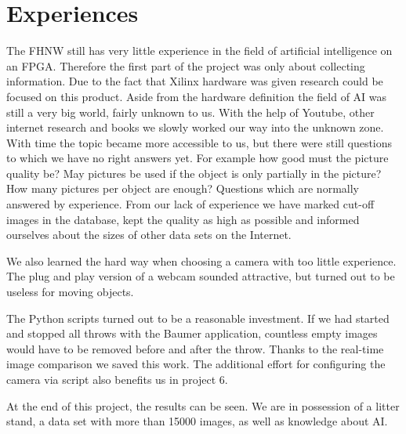 \section{Experiences}
\label{sec:experiences}

The FHNW still has very little experience in the field of artificial intelligence on an FPGA.
Therefore the first part of the project was only about collecting information.
Due to the fact that Xilinx hardware was given research could be focused on this product.
Aside from the hardware definition the field of AI was still a very big world, fairly unknown to us.
With the help of Youtube, other internet research and books we slowly worked our way into the unknown zone. 
With time the topic became more accessible to us, but there were still questions to which we have no right answers yet.
For example how good must the picture quality be? 
May pictures be used if the object is only partially in the picture?
How many pictures per object are enough?
Questions which are normally answered by experience.
From our lack of experience we have marked cut-off images in the database, kept the quality as high as possible and informed ourselves about the sizes of other data sets on the Internet.

We also learned the hard way when choosing a camera with too little experience.
The plug and play version of a webcam sounded attractive, but turned out to be useless for moving objects.

The Python scripts turned out to be a reasonable investment.
If we had started and stopped all throws with the Baumer application, countless empty images would have to be removed before and after the throw.
Thanks to the real-time image comparison we saved this work.
The additional effort for configuring the camera via script also benefits us in project 6.

At the end of this project, the results can be seen.
We are in possession of a litter stand, a data set with more than \num{15000} images, as well as knowledge about AI.
